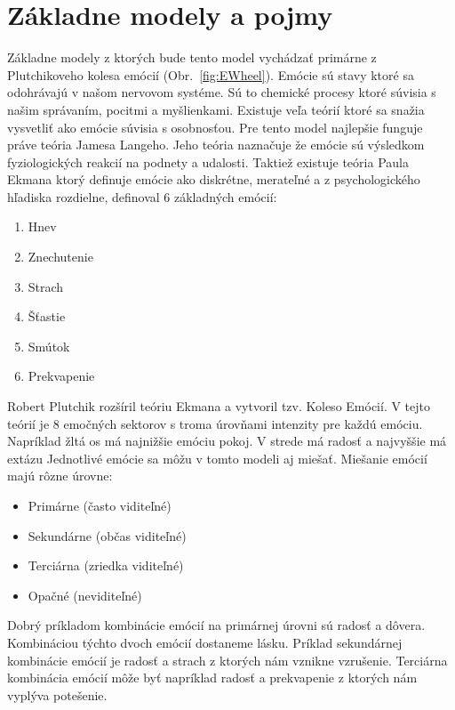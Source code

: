 \documentclass[10pt,twoside,slovak,a4paper]{article}
\begin{document}

\section{Základne modely a pojmy}\label{zaklad}

Základne modely z ktorých bude tento model vychádzať primárne z Plutchikoveho kolesa emócií
(Obr.~\ref{fig:EWheel}). Emócie sú stavy ktoré sa odohrávajú v našom nervovom systéme. Sú to chemické
procesy ktoré súvisia s našim správaním, pocitmi a myšlienkami. Existuje veľa teórií ktoré sa snažia
vysvetliť ako emócie súvisia s osobnosťou. Pre tento model najlepšie funguje práve teória Jamesa Langeho.
Jeho teória naznačuje že emócie sú výsledkom fyziologických reakcií na podnety a udalosti. Taktiež existuje
teória Paula Ekmana ktorý definuje emócie ako diskrétne, merateľné a z psychologického hľadiska
rozdielne, definoval 6 základných emócií:

\begin{enumerate}
	\item Hnev
	\item Znechutenie
	\item Strach
	\item Šťastie
	\item Smútok
	\item Prekvapenie
\end{enumerate}

Robert Plutchik rozšíril teóriu Ekmana a vytvoril tzv. Koleso Emócií. V tejto teórií je 8
emočných sektorov s troma úrovňami intenzity pre každú emóciu. Napríklad žltá os má najnižšie
emóciu pokoj. V strede má radosť a najvyššie má extázu Jednotlivé emócie sa môžu v tomto modeli
aj miešať. Miešanie emócií majú rôzne úrovne:

\begin{itemize}
	\item Primárne (často viditeľné)
	\item Sekundárne (občas viditeľné)
	\item Terciárna (zriedka viditeľné)
	\item Opačné (neviditeľné)
\end{itemize}

Dobrý príkladom kombinácie emócií na primárnej úrovni sú radosť a dôvera.
Kombináciou týchto dvoch emócií dostaneme lásku. Príklad sekundárnej kombinácie
emócií je radosť a strach z ktorých nám vznikne vzrušenie. Terciárna kombinácia
emócií môže byť napríklad radosť a prekvapenie z ktorých nám vyplýva potešenie.
\end{document}
